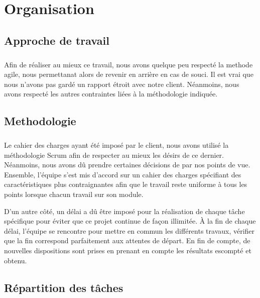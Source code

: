 \chapter{Organisation}
        \section{Approche de travail}
\paragraph{}
Afin de réaliser au mieux ce travail, nous avons quelque peu respecté la methode agile,
nous permettanat alors de revenir en arrière en cas de souci. Il est vrai que nous
n'avons pas gardé un rapport étroit avec notre client. Néanmoins, nous avons respecté 
les autres contraintes liées à la méthodologie indiquée.
        \section{Methodologie}
\paragraph{}
Le cahier des charges ayant été imposé par le client, nous avons utilisé la méthodologie
Scrum afin de respecter au mieux les désirs de ce dernier. Néanmoins, nous avons dû prendre
certaines décisions de par nos points de vue. Ensemble, l'équipe s'est mis d'accord sur un
cahier des charges spécifiant des caractéristiques plus contraignantes afin que le travail
reste uniforme à tous les points lorsque chacun travail sur son module. \par 
D'un autre côté, un délai a dû être imposé pour la réalisation de chaque tâche spécifique
pour éviter que ce projet continue de façon illimitée. À la fin de chaque délai, l'équipe
se rencontre pour mettre en commun les différents travaux, vérifier que la fin correspond
parfaitement aux attentes de départ. En fin de compte, de nouvelles dispositions sont 
prises en prenant en compte les résultats escompté et obtenu.
        \section{Répartition des tâches}
